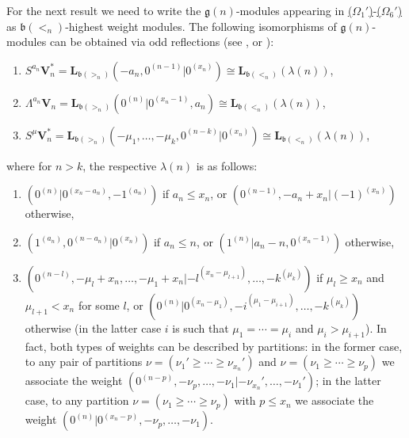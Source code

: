 \documentclass[12pt]{amsart}
\newcommand\g{\mathfrak{g}}
\newcommand\fb{\mathfrak{b}}
\newcommand\bV{\mathbf{V}}
\newcommand\bL{\mathbf{L}}
\theoremstyle{plain}
\theoremstyle{definition}
\numberwithin{equation}{section}
\begin{document}
For the next result we need to write the $\g(n)$-modules appearing in {\rm \hyperref[sym.type.mod]{($\Omega_1'$)}-\hyperref[partition.type.mod.dual]{($\Omega_6'$)}} as $\fb(<_n)$-highest weight modules. The following isomorphisms of $\g(n)$-modules can be obtained via odd reflections (see \cite[Lemma~10.2]{Ser11}, or \cite[Lemma~3]{PS94}):
\begin{enumerate}
\item $S^{a_n}\bV_{n}^* = \bL_{\fb(>_n)}(-a_n, 0^{(n-1)}|0^{(x_n)}) \cong  \bL_{\fb(<_n)}(\lambda(n))$,
\item  $\Lambda^{a_n}\bV_{n} = \bL_{\fb(>_n)}(0^{(n)}|0^{(x_n-1)}, a_n) \cong \bL_{\fb(<_n)}(\lambda(n))$,
\item  $S^\mu \bV_n^* =  \bL_{\fb(>_n)}(-\mu_1,\ldots,-\mu_k,0^{(n-k)}|0^{(x_n)}) \cong \bL_{\fb(<_n)}(\lambda(n))$,
\end{enumerate}
where for $n > k$, the respective $\lambda(n)$ is as follows:
\begin{enumerate}
\item [(${\widetilde \Omega}_2$)] \label{sym.type.mod.dual.b(<)} $(0^{(n)}|0^{(x_n-a_n)}, -1^{(a_n)})$ if $a_n\leq x_n$, or $(0^{(n-1)}, -a_n + x_n| (-1)^{(x_n)})$ otherwise,
\item [(${\widetilde {\Omega}}_3$)] \label{ext.type.mod.b(<)}  $(1^{(a_n)},0^{(n-a_n)}|0^{(x_n)})$ if $a_n\leq n$, or $(1^{(n)}|a_n-n, 0^{(x_n-1)})$ otherwise,
\item [(${\widetilde{\Omega}}_6$)] \label{partition.type.mod.dual.b(<)} $(0^{(n-l)}, -\mu_l+x_n,\ldots,-\mu_1+x_n|-l^{(x_n - \mu_{l+1})},\ldots,-k^{(\mu_k)})$ if $\mu_l\geq x_n$ and $\mu_{l+1}<x_n$ for some $l$, or $(0^{(n)}|0^{(x_n-\mu_1)},-i^{(\mu_1 - \mu_{i+1})},\ldots,-k^{(\mu_k)})$ otherwise (in the latter case $i$ is such that $\mu_1=\cdots=\mu_i$ and $\mu_i>\mu_{i+1}$). In fact, both types of weights can be described by partitions: in the former case, to any pair of partitions $\nu = (\nu_1'\geq\cdots \geq \nu_{x_n}')$ and $\nu = (\nu_1\geq\cdots \geq \nu_p)$ we associate the weight $(0^{(n-p)},-\nu_p, \ldots, -\nu_1 |-\nu_{x_n}',\ldots, -\nu_1')$; in the latter case, to any partition $\nu = (\nu_1\geq\cdots \geq \nu_p)$ with $p\leq x_n$ we associate the weight $(0^{(n)} | 0^{(x_n-p)},-\nu_p,\ldots, -\nu_1)$.
\end{enumerate}
\end{document}

